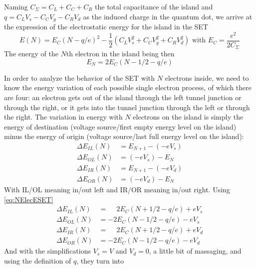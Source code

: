 \documentclass[../main.tex]{subfiles}
\begin{document}
Naming \(C_{\Sigma} = C_{L} + C_{C} + C_{R}\) the total capacitance of the
island and \(q = C_{L}V_{s} - C_{C}V_{g} - C_{R}V_{d}\) as the induced charge
in the quantum dot, we arrive at the expression of the electrostatic energy
for the island in the SET
\begin{equation*}
\label{eq:ElecESET}
    E(N) = E_{C}(N - q/e)^2
             - \frac{1}{2}\left(C_{L}V_{s}^2 + C_{C}V_{g}^2 + C_{R}V_{d}^2\right)
             \text{ with } E_{C} = \frac{e^2}{2 C_{\Sigma}}
\end{equation*}
The energy of the \(N\)th electron in the island being then
\begin{equation}
\label{eq:NElecESET}
    E_{N} = 2E_{C}(N - 1/2 - q/e)
\end{equation}

In order to analyze the behavior of the SET with \(N\) electrons inside, we
need to know the energy variation of each possible single electron process,
of which there are four: an electron gets out of the island through the
left tunnel junction or through the right, or it gets into the tunnel junction
through the left or through the right. The variation in energy with \(N\)
electrons on the island is simply the energy of destination (voltage
source/first empty energy level on the island) minus the energy of origin
(voltage source/last full energy level on the island):
\begin{align*}
    \Delta E_{IL}(N) &= E_{N+1} - (-eV_{s})\\
    \Delta E_{OL}(N) &= (-eV_{s}) - E_{N}\\
    \Delta E_{IR}(N) &= E_{N + 1} - (-eV_{d})\\
    \Delta E_{OR}(N) &= (-eV_{d}) - E_{N}
\end{align*}
With IL/OL meaning in/out left and IR/OR meaning in/out right. Using \ref{eq:NElecESET}
\begin{align*}
    \Delta E_{IL}(N) &= \phantom{-}2E_{C}(N + 1/2 - q/e) + eV_{s}\\
    \Delta E_{OL}(N) &= -2E_{C}(N - 1/2 - q/e) - eV_{s}\\
    \Delta E_{IR}(N) &= \phantom{-}2E_{C}(N + 1/2 - q/e) + eV_{d}\\
    \Delta E_{OR}(N) &= -2E_{C}(N - 1/2 - q/e) - eV_{d}
\end{align*}
And with the simplifications \(V_{s} =  V\) and \(V_{d} = 0\), a little
bit of massaging, and using the definition of \(q\), they turn into
\end{document}

